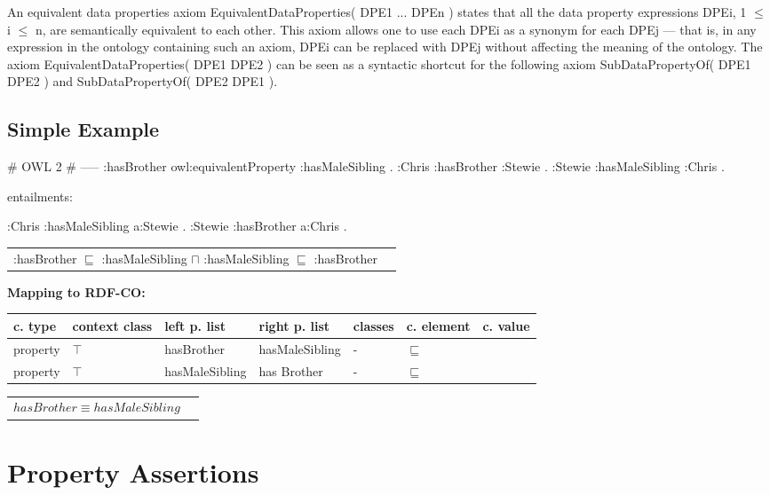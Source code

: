 \documentclass{llncs}
\newenvironment{gcotable}{
  \scriptsize
  \sffamily
  \vspace{0cm}
	\begin{center}
	\textbf{\vspace{0.4cm}Mapping to RDF-CO:} \\
  \begin{tabular}{l|l|l|l|l|l|l}
	\hline
  \textbf{c. type} & \textbf{context class} & \textbf{left p. list} & \textbf{right p. list} & \textbf{classes} & \textbf{c. element} & \textbf{c. value} \\
  \hline

}{
  \hline
  \end{tabular}
	\end{center}
}
\newenvironment{DL}{
  \vspace{0cm}
	\begin{center}
  \begin{tabular}{r l}

}{
  \end{tabular}
	\end{center}
}
\begin{document}
An equivalent data properties axiom EquivalentDataProperties( DPE1 ... DPEn ) states that all the data property expressions DPEi, 1 $\leq$ i $\leq$ n, are semantically equivalent to each other. This axiom allows one to use each DPEi as a synonym for each DPEj — that is, in any expression in the ontology containing such an axiom, DPEi can be replaced with DPEj without affecting the meaning of the ontology. The axiom EquivalentDataProperties( DPE1 DPE2 ) can be seen as a syntactic shortcut for the following axiom SubDataPropertyOf( DPE1 DPE2 ) and SubDataPropertyOf( DPE2 DPE1 ).

\subsection{Simple Example}

\begin{ex}
# OWL 2
# -----
:hasBrother owl:equivalentProperty :hasMaleSibling . 
:Chris :hasBrother :Stewie . 
:Stewie :hasMaleSibling :Chris .
\end{ex}

entailments:

\begin{ex}
:Chris :hasMaleSibling a:Stewie . 
:Stewie :hasBrother a:Chris .
\end{ex}

\begin{DL}
:hasBrother $\sqsubseteq$ :hasMaleSibling $\sqcap$ :hasMaleSibling $\sqsubseteq$ :hasBrother \\
\end{DL}

\begin{gcotable}
property & $\top$ & hasBrother & hasMaleSibling & - & $\sqsubseteq$ \\
property & $\top$ & hasMaleSibling & has Brother & - & $\sqsubseteq$ \\
\end{gcotable}

\begin{DL}
$hasBrother \equiv hasMaleSibling$
\end{DL}

\section{Property Assertions}
\end{document}
